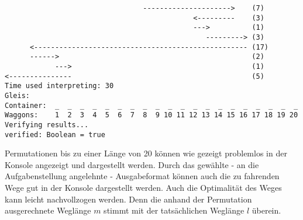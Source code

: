 \begin{lstlisting}
                                 --------------------->    (7)
                                             <---------    (3)
                                             --->          (1)
                                                ---------> (3)
      <--------------------------------------------------- (17)
      ------>                                              (2)
            --->                                           (1)
<---------------                                           (5)
Time used interpreting: 30
Gleis: 
Container:  _  _  _  _  _  _  _  _  _  _  _  _  _  _  _  _  _  _  _  _
Waggons:    1  2  3  4  5  6  7  8  9 10 11 12 13 14 15 16 17 18 19 20
Verifying results...
verified: Boolean = true
\end{lstlisting}
Permutationen bis zu einer Länge von 20 können wie gezeigt problemlos in der Konsole angezeigt und dargestellt werden.
Durch das gewählte - an die Aufgabenstellung angelehnte - Ausgabeformat können auch die zu fahrenden Wege gut in der Konsole dargestellt werden.
Auch die Optimalität des Weges kann leicht nachvollzogen werden.
Denn die anhand der Permutation ausgerechnete Weglänge $m$ stimmt mit der tatsächlichen Weglänge $l$ überein.

